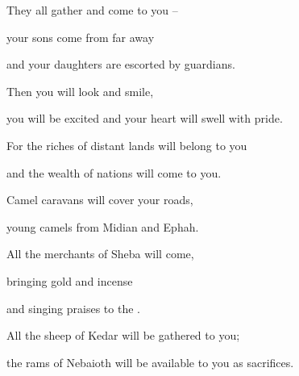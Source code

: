 {\par }{\Q They all
gather
and come to you –
\par }{\Q your sons come from far away
\par }{\Q and your daughters are escorted by guardians.
\par }{\Q {}Then
you will look
and smile,

\par }{\Q you will be excited
and your
heart
will swell with pride.

\par }{\Q For
the riches of distant lands
will belong to you
\par }{\Q and the wealth
of nations
will come to you.
\par }{\Q {}Camel
caravans
will cover
your roads,

\par }{\Q young camels
from Midian
and Ephah.
\par }{\Q All
the merchants of Sheba
will come,
\par }{\Q bringing gold
and incense
\par }{\Q and singing
praises
to the
{}.
\par }{\Q {}All
the sheep
of Kedar
will be gathered
to you;
\par }{\Q the rams
of Nebaioth
will be available
to you as sacrifices.

}
